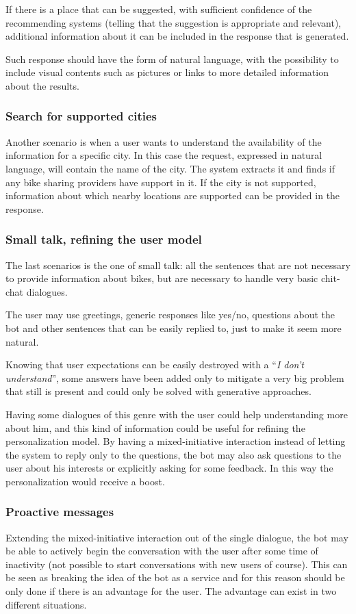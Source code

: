 If there is a place that can be suggested, with sufficient confidence of the recommending systems (telling that the suggestion is appropriate and relevant), additional information about it can be included in the response that is generated.

Such response should have the form of natural language, with the possibility to include visual contents such as pictures or links to more detailed information about the results.

\subsubsection{Search for supported cities}
Another scenario is when a user wants to understand the availability of the information for a specific city. In this case the request, expressed in natural language, will contain the name of the city. The system extracts it and finds if any bike sharing providers have support in it. If the city is not supported, information about which nearby locations are supported can be provided in the response.

\subsubsection{Small talk, refining the user model}
The last scenarios is the one of small talk: all the sentences that are not necessary to provide information about bikes, but are necessary to handle very basic chit-chat dialogues.

The user may use greetings, generic responses like yes/no, questions about the bot and other sentences that can be easily replied to, just to make it seem more natural.

Knowing that user expectations can be easily destroyed with a ``\textit{I don't understand}'', some answers have been added only to mitigate a very big problem that still is present and could only be solved with generative approaches.

Having some dialogues of this genre with the user could help understanding more about him, and this kind of information could be useful for refining the personalization model. By having a mixed-initiative interaction instead of letting the system to reply only to the questions, the bot may also ask questions to the user about his interests or explicitly asking for some feedback. In this way the personalization would receive a boost.

\subsubsection{Proactive messages}
Extending the mixed-initiative interaction out of the single dialogue, the bot may be able to actively begin the conversation with the user after some time of inactivity (not possible to start conversations with new users of course). This can be seen as breaking the idea of the bot as a service and for this reason should be only done if there is an advantage for the user. The advantage can exist in two different situations.

